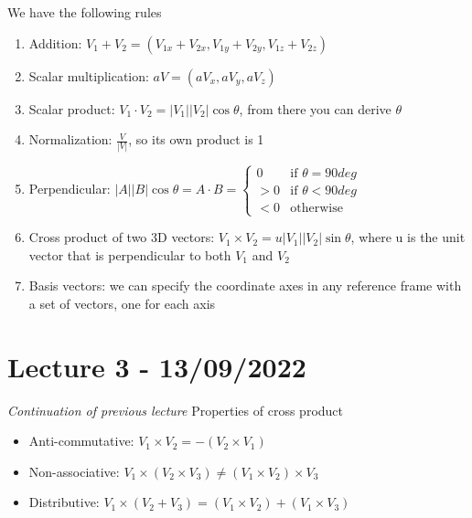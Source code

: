 \documentclass[11pt]{article}
\begin{document}
We have the following rules
\begin{enumerate}
    \item Addition: $V_1 + V_2 = (V_{1x} + V_{2x}, V_{1y} + V_{2y}, V_{1z} + V_{2z})$
    \item Scalar multiplication: $aV = (aV_x, aV_y, aV_z)$
    \item Scalar product: $V_1 \cdot V_2 = |V_1||V_2|\cos \theta$, from there you can derive $\theta$    
    \item Normalization: $\frac{V}{|V|}$, so its own product is 1
    \item Perpendicular: $|A||B|\cos \theta = A \cdot B =
     \begin{cases}
        0 & \text{if } \theta = 90 deg\\
        > 0 & \text{if }\theta < 90 deg\\
        < 0 & \text{otherwise}
    \end{cases}$  
    \item Cross product of two 3D vectors: $V_1 \times V_2 = u |V_1||V_2|\sin \theta$, where u is the unit vector that is perpendicular to both $V_1$ and $V_2$ %
    \item Basis vectors: we can specify the coordinate axes in any reference frame with a set of vectors, one for each axis
\end{enumerate}

\section{Lecture 3 - 13/09/2022}
\textit{Continuation of previous lecture}
Properties of cross product
\newline
\begin{itemize}
    \item Anti-commutative: $V_1 \times V_2 = -(V_2 \times V_1)$
    \item Non-associative: $V_1 \times (V_2 \times V_3) \neq (V_1 \times V_2) \times V_3$
    \item Distributive: $V_1 \times (V_2 + V_3) = (V_1 \times V_2) + (V_1 \times V_3)$   
\end{itemize}
\end{document}
